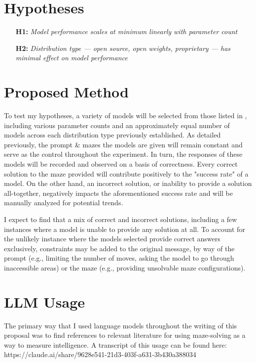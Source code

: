 \documentclass[conference]{IEEEtran}
\begin{document}
\section{Hypotheses}
\begin{enumerate}
    \item[\textbf{H1:}] \textit{Model performance scales at minimum linearly with parameter count}
    \item[\textbf{H2:}] \textit{Distribution type --- open source, open weights, proprietary --- has minimal effect on model performance}
\end{enumerate}

\section{Proposed Method}
To test my hypotheses, a variety of models will be selected from those listed in \cite{ext4}, including various parameter counts and an approximately equal number of models across each distribution type previously established. As detailed previously, the prompt \& mazes the models are given will remain constant and serve as the control throughout the experiment. In turn, the responses of these models will be recorded and observed on a basis of correctness. Every correct solution to the maze provided will contribute positively to the "success rate" of a model. On the other hand, an incorrect solution, or inability to provide a solution all-together, negatively impacts the aforementioned success rate and will be manually analyzed for potential trends. 

I expect to find that a mix of correct and incorrect solutions, including a few instances where a model is unable to provide any solution at all. To account for the unlikely instance where the models selected provide correct answers exclusively, constraints may be added to the original message, by way of the prompt (e.g., limiting the number of moves, asking the model to go through inaccessible areas) or the maze (e.g., providing unsolvable maze configurations).

\section{LLM Usage}

The primary way that I used language models throughout the writing of this proposal was to find references to relevant literature for using maze-solving as a way to measure intelligence. A transcript of this usage can be found here: https://claude.ai/share/9628e541-21d3-403f-a631-3b430a388034
\end{document}
